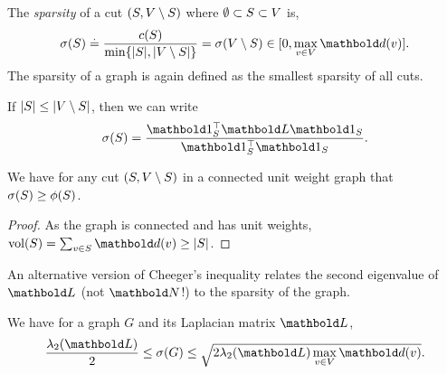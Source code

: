 \begin{defn}[Sparsity] The \emph{sparsity} of a cut $(S, V \setminus S)$ where $\emptyset \subset S \subset V$ is, \begin{align}
    \sigma(\sS) \defeq \frac{c(\sS)}{\min\{|\sS|, |\sV \setminus \sS|\}} = \sigma(\sV \setminus \sS) \in [0, \max_{v \in \sV} \vd(v)].
\end{align} The sparsity of a graph is again defined as the smallest sparsity of all cuts.
\end{defn}
\begin{rmk}
If $|S| \leq |V \setminus S|$, then we can write \begin{align}
    \sigma(\sS) = \frac{\trans{\vOne_\sS}\mL\vOne_\sS}{\trans{\vOne_\sS}\vOne_\sS}.
\end{align}
\end{rmk}

\begin{lem}
We have for any cut $(S, V \setminus S)$ in a connected unit weight graph that $\sigma(S) \geq \phi(S)$.
\end{lem}
\begin{proof}
As the graph is connected and has unit weights, $\vol(\sS) = \sum_{v \in \sS} \vd(v) \geq |\sS|$.
\end{proof}

An alternative version of Cheeger's inequality relates the second eigenvalue of $\mL$ (not $\mN$!) to the sparsity of the graph.

\begin{fct} We have for a graph $G$ and its Laplacian matrix $\mL$, \begin{align}
    \frac{\lambda_2(\mL)}{2} \leq \sigma(G) \leq \sqrt{2 \lambda_2(\mL) \max_{v \in \sV} \vd(v)}.
\end{align}
\end{fct}